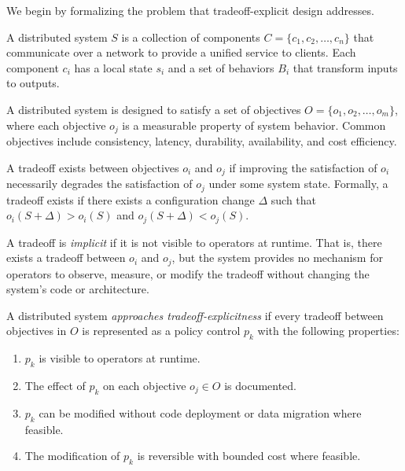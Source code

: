 \documentclass[conference]{IEEEtran}
\begin{document}
We begin by formalizing the problem that tradeoff-explicit design addresses.

\begin{definition}
A distributed system $S$ is a collection of components $C = \{c_1, c_2, \ldots, c_n\}$ that communicate over a network to provide a unified service to clients. Each component $c_i$ has a local state $s_i$ and a set of behaviors $B_i$ that transform inputs to outputs.
\end{definition}

\begin{definition}
A distributed system is designed to satisfy a set of objectives $O = \{o_1, o_2, \ldots, o_m\}$, where each objective $o_j$ is a measurable property of system behavior. Common objectives include consistency, latency, durability, availability, and cost efficiency.
\end{definition}

\begin{definition}[Tradeoff]
A tradeoff exists between objectives $o_i$ and $o_j$ if improving the satisfaction of $o_i$ necessarily degrades the satisfaction of $o_j$ under some system state. Formally, a tradeoff exists if there exists a configuration change $\Delta$ such that $o_i(S + \Delta) > o_i(S)$ and $o_j(S + \Delta) < o_j(S)$.
\end{definition}

\begin{definition}
A tradeoff is \textit{implicit} if it is not visible to operators at runtime. That is, there exists a tradeoff between $o_i$ and $o_j$, but the system provides no mechanism for operators to observe, measure, or modify the tradeoff without changing the system's code or architecture.
\end{definition}

\begin{definition}
A distributed system \textit{approaches tradeoff-explicitness} if every tradeoff between objectives in $O$ is represented as a policy control $p_k$ with the following properties:
\begin{enumerate}
    \item $p_k$ is visible to operators at runtime.
    \item The effect of $p_k$ on each objective $o_j \in O$ is documented.
    \item $p_k$ can be modified without code deployment or data migration where feasible.
    \item The modification of $p_k$ is reversible with bounded cost where feasible.
\end{enumerate}
\end{definition}
\end{document}
